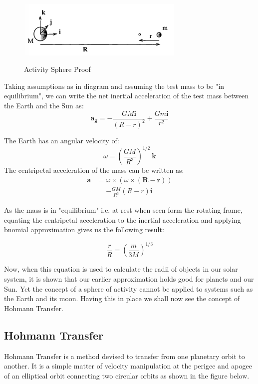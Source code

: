 \documentclass[12pt, letterpaper]{article}
\begin{document}
\begin{figure}[ht]
	\centering
    \includegraphics[width = 300px]{ASphere}
    \label{fig:ASphere}
    \caption{Activity Sphere Proof}
\end{figure}

Taking assumptions as in diagram and assuming the test mass to be "in equilibrium", we can write the net inertial acceleration of the test mass between the Earth and the Sun as:
\[
	\mathbf{a_g} = -\frac{GM\mathbf{i}}{(R-r)^2} + \frac{Gm\mathbf{i}}{r^2}
\]

The Earth has an angular velocity of:
\[
	\omega = \left(\frac{GM}{R^3}\right)^{1/2} \: \mathbf{k}
\]
The centripetal acceleration of the mass can be written as:
\begin{equation}
\begin{split}
	\mathbf{a} & = \omega \times(\omega \times (\mathbf{R} - \mathbf{r}))\\
				& = - \frac{GM}{R^3}(R - r)\mathbf{i}
\end{split}
\end{equation}

As the mass is in "equilibrium" i.e. at rest when seen form the rotating frame, equating the centripetal acceleration to the inertial acceleration and applying bnomial approximation gives us the following result:

\[
	\frac{r}{R} = \left( \frac{m}{3M} \right)^{1/3}
\]

Now, when this equation is used to calculate the radii of objects in our solar system, it is shown that our earlier approximation holds good for planets and our Sun. Yet the concept of a sphere of activity cannot be applied to systems such as the Earth and its moon. Having this in place we shall now see the concept of Hohmann Transfer.

\subsection{Hohmann Transfer}
Hohmann Transfer is a method devised to transfer from one planetary orbit to another. It is a simple matter of velocity manipulation at the perigee and apogee of an elliptical orbit connecting two circular orbits as shown in the figure below. 
\end{document}
